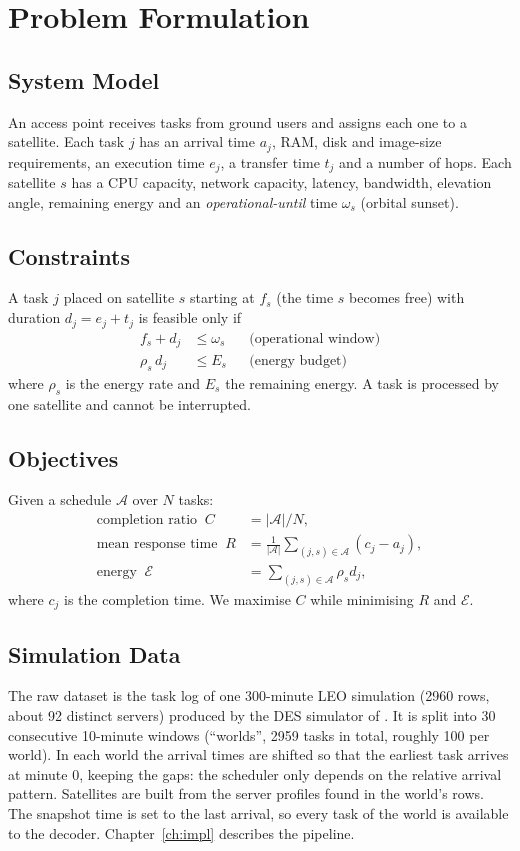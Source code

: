 \chapter{Problem Formulation}
\label{ch:problem}

\section{System Model}
An access point receives tasks from ground users and assigns each one to a
satellite. Each task $j$ has an arrival time $a_j$, RAM, disk and image-size
requirements, an execution time $e_j$, a transfer time $t_j$ and a number of
hops. Each satellite $s$ has a CPU capacity, network capacity, latency,
bandwidth, elevation angle, remaining energy and an \emph{operational-until}
time $\omega_s$ (orbital sunset).

\section{Constraints}
A task $j$ placed on satellite $s$ starting at $f_s$ (the time $s$ becomes free)
with duration $d_j = e_j + t_j$ is feasible only if
\begin{align}
  f_s + d_j &\le \omega_s && \text{(operational window)}\\
  \rho_s\, d_j &\le E_s   && \text{(energy budget)}
\end{align}
where $\rho_s$ is the energy rate and $E_s$ the remaining energy. A task is
processed by one satellite and cannot be interrupted.

\section{Objectives}
Given a schedule $\mathcal{A}$ over $N$ tasks:
\begin{align}
  \text{completion ratio}\;\; C &= |\mathcal{A}|/N,\\
  \text{mean response time}\;\; R &= \tfrac{1}{|\mathcal{A}|}\sum_{(j,s)\in\mathcal{A}} (c_j - a_j),\\
  \text{energy}\;\; \mathcal{E} &= \sum_{(j,s)\in\mathcal{A}} \rho_s d_j,
\end{align}
where $c_j$ is the completion time. We maximise $C$ while minimising $R$ and
$\mathcal{E}$.

\section{Simulation Data}
The raw dataset is the task log of one 300-minute LEO simulation (2960 rows, about 92 distinct
servers) produced by the DES simulator of \citet{magliarisi2025orbit}. It is split into 30
consecutive 10-minute windows (``worlds'', 2959 tasks in total, roughly 100 per world). In each
world the arrival times are shifted so that the earliest task arrives at minute 0, keeping the gaps:
the scheduler only depends on the relative arrival pattern. Satellites are built from the server
profiles found in the world's rows. The snapshot time is set to the last arrival, so every task of
the world is available to the decoder. Chapter~\ref{ch:impl} describes the pipeline.

